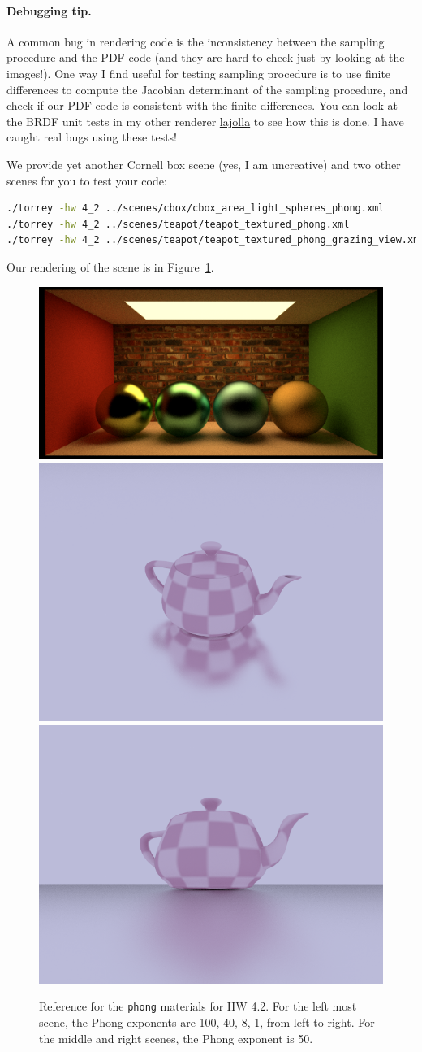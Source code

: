 \paragraph{Debugging tip.} A common bug in rendering code is the inconsistency between the sampling procedure and the PDF code (and they are hard to check just by looking at the images!). One way I find useful for testing sampling procedure is to use finite differences to compute the Jacobian determinant of the sampling procedure, and check if our PDF code is consistent with the finite differences. You can look at the BRDF unit tests in my other renderer \href{https://github.com/BachiLi/lajolla_public/blob/main/src/tests/materials.cpp}{lajolla} to see how this is done. I have caught real bugs using these tests!

We provide yet another Cornell box scene (yes, I am uncreative) and two other scenes for you to test your code:
\begin{lstlisting}[language=bash]
./torrey -hw 4_2 ../scenes/cbox/cbox_area_light_spheres_phong.xml
./torrey -hw 4_2 ../scenes/teapot/teapot_textured_phong.xml
./torrey -hw 4_2 ../scenes/teapot/teapot_textured_phong_grazing_view.xml
\end{lstlisting}
Our rendering of the scene is in Figure~\ref{fig:hw_4_2_phong}.

\begin{figure}[ht]
    \centering
    \includegraphics[width=0.45\linewidth]{imgs/hw_4_2c.png}
    \includegraphics[width=0.225\linewidth]{imgs/hw_4_2d.png}
    \includegraphics[width=0.225\linewidth]{imgs/hw_4_2e.png}
    \caption{Reference for the \lstinline{phong} materials for HW 4.2. For the left most scene, the Phong exponents are 100, 40, 8, 1, from left to right. For the middle and right scenes, the Phong exponent is 50.}
    \label{fig:hw_4_2_phong}
\end{figure}

